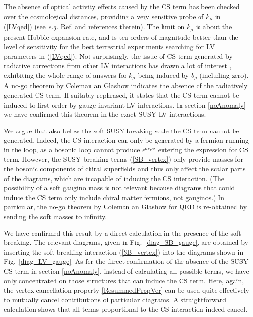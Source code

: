 \documentclass[12pt]{revtex4}
\begin{document}
 
The absence of optical activity effects caused by the CS term has been
checked over the cosmological distances, providing 
a very sensitive probe of $k_\mu$ in (\ref{LVqed}) (see {\em e.g.}
Ref. \cite{CFJ} and references therein). The limit on $k_\mu$ is about
the present Hubble expansion rate, and is ten orders of magnitude
better than the level of sensitivity for the best terrestrial
experiments searching for LV parameters in (\ref{LVqed}). Not
surprisingly, the issue of CS term generated by radiative corrections
from other LV interactions has drawn a lot of interest
\cite{CG,Jackiw:1999yp,Chung:1998jv,Andrianov:2001zj}, exhibiting the
whole range of answers for $k_\mu$ being induced by $b_\mu$ (including
zero). A no-go theorem by Coleman an Glashow \cite{CG}
indicates the absence of the radiatively generated CS
term. If suitably rephrased, it states that the CS term
cannot be induced to first order by gauge invariant LV interactions. 
In section \ref{noAnomaly} we have confirmed this theorem in the exact
SUSY LV interactions. 


We argue that also below the soft SUSY breaking scale the CS term
cannot be generated. Indeed, the CS interaction can only be generated
by a fermion running in the loop, as a bosonic loop cannot produce 
$ \epsilon^{\mu\nu\rho\sigma} $ entering the expression for CS term. 
However, the SUSY breaking terms (\ref{SB_vertex}) only 
provide masses for the bosonic components of chiral superfields
and thus only affect the scalar parts of the diagrams, which are 
incapable of inducing the CS interaction. (The possibility of a
soft gaugino mass is not relevant because diagrams that could induce
the CS term only include chiral matter fermions, not gauginos.) 
In particular, the no-go theorem by Coleman an Glashow \cite{CG} for
QED is re-obtained by sending the soft masses to infinity. 


We have confirmed this result by a direct calculation in the presence of
the soft-breaking. The relevant diagrams, given in
Fig.~\ref{diag_SB_gauge}, are obtained by inserting the soft breaking
interaction (\ref{SB_vertex}) into the diagrams shown in
Fig.~\ref{diag_LV_gauge}. As for the direct confirmation of the
absence of the SUSY CS term in section \ref{noAnomaly}, instead of
calculating all possible terms, we have only concentrated on those
structures that can induce the CS term. Here, again, the vertex
cancellation property \eqref{ResummedPropVer} can be used quite
effectively to mutually cancel contributions of particular diagrams.
A straightforward calculation shows that all terms proportional to the
CS interaction indeed cancel. 
\end{document}
